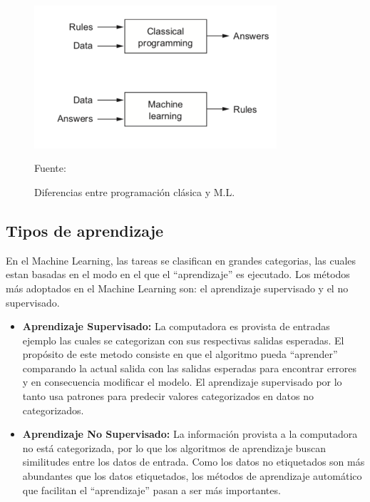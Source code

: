 \begin{figure}[H]
    \begin{center}
        \includegraphics[width=9cm]{img/capitulo_2/machinelearning.png}
    \end{center}
    \begin{center}
        \caption{Diferencias entre programación clásica y M.L.}
        Fuente: \cite{classicprog_and_ml}
        \label{fig:prog_classical_ml}
    \end{center}
\end{figure}
\subsection{Tipos de aprendizaje}
En el Machine Learning, las tareas se clasifican en grandes categorias, las cuales estan basadas en el modo en el que el ``aprendizaje'' es ejecutado. Los métodos más adoptados en el Machine Learning son: el aprendizaje supervisado y el no supervisado.\\

\begin{itemize}
    \item \textbf{Aprendizaje Supervisado:} La computadora es provista de entradas ejemplo las cuales se categorizan con sus respectivas salidas esperadas. El propósito de este metodo consiste en que el algoritmo pueda  ``aprender'' comparando la actual salida con las salidas esperadas para encontrar errores y en consecuencia modificar el modelo. El aprendizaje supervisado por lo tanto usa patrones para predecir valores categorizados en datos no categorizados.\\

    \item \textbf{Aprendizaje No Supervisado:} La información provista a la computadora no está categorizada, por lo que los algoritmos de aprendizaje buscan similitudes entre los datos de entrada. Como los datos no etiquetados son más abundantes que los datos etiquetados, los métodos de aprendizaje automático que facilitan el ``aprendizaje'' pasan a ser más importantes.\\
\end{itemize}

